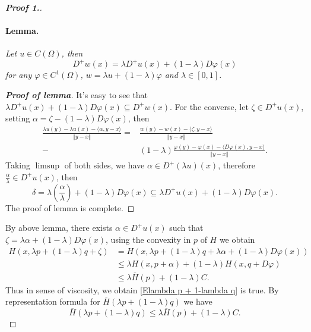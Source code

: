 \documentclass[12pt, oneside]{amsart}  	%
\begin{document}
\begin{proof}[\textbf{Proof 1.}]
\paragraph{\textbf{Lemma.}} \textit{Let $u\in C(\Omega)$, then
\begin{equation*}
D^+w(x) = \lambda D^+u(x) + (1-\lambda)D\varphi(x)
\end{equation*}
for any $\varphi\in C^1(\Omega)$, $w = \lambda u + (1-\lambda)\varphi$ and $\lambda\in [0,1]$.}\\
\vspace*{0.3cm}
\begin{proof}[\textbf{Proof of lemma}] It's easy to see that $\lambda D^+u(x) + (1-\lambda)D\varphi(x) \subseteq D^+w(x)$. For the converse, let $\zeta\in D^+u(x)$, setting $\alpha = \zeta - (1-\lambda)D\varphi(x)$, then
\begin{align*}
\frac{\lambda u(y) - \lambda u(x) - \langle \alpha,y-x \rangle}{\Vert y-x\Vert} = &\frac{w(y) - w(x) - \langle \zeta,y-x \rangle}{\Vert y-x\Vert} \\
- &(1-\lambda)\frac{\varphi(y) - \varphi(x) - \langle D\varphi(x),y-x\rangle}{\Vert y-x\Vert}.
\end{align*}
Taking $\limsup$ of both sides, we have $\alpha\in D^+(\lambda u)(x)$, therefore $\frac{\alpha}{\lambda}\in D^+u(x)$, then
\begin{equation*}
\delta = \lambda\left( \frac{\alpha}{\lambda}\right) + (1-\lambda)D\varphi(x) \subseteq \lambda D^+u(x) + (1-\lambda)D\varphi(x).
\end{equation*}
The proof of lemma is complete.
\end{proof}
\vspace*{0.2cm}
By above lemma, there exists $\alpha\in D^+u(x)$ such that $\zeta = \lambda \alpha + (1-\lambda)D\varphi(x)$, using the convexity in $p$ of $H$ we obtain
\begin{align*}
H\left(x,\lambda p +(1-\lambda)q + \zeta\right) &= H\left(x,\lambda p +(1-\lambda)q + \lambda \alpha + (1-\lambda)D\varphi(x)\right) \\
&\leq \lambda H(x,p+\alpha) + (1-\lambda)H(x,q+D\varphi) \\
&\leq \lambda \overline{H}(p) + (1-\lambda)C.
\end{align*}
Thus in sense of viscosity, we obtain \eqref{Elambda p + 1-lambda q} is true. By representation formula for $\overline{H}\left(\lambda p + (1-\lambda)q\right)$ we have
\begin{equation*}
\overline{H}\left(\lambda p + (1-\lambda)q\right) \leq \lambda \overline{H}(p) + (1-\lambda)C.

\end{equation*}
\end{proof}
\end{document}
